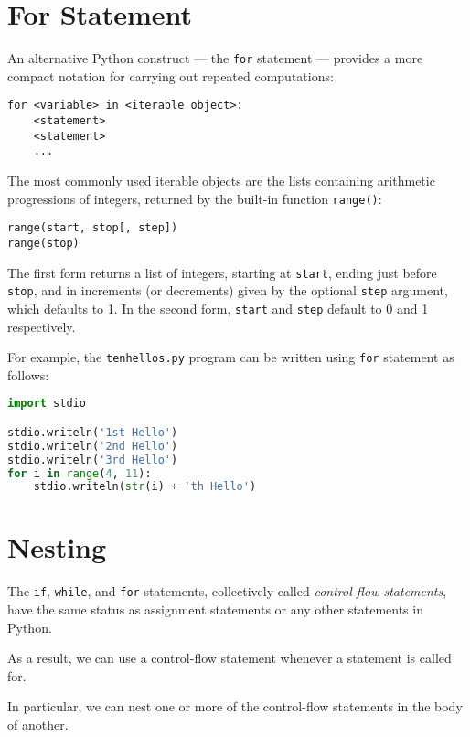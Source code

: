 \documentclass[8pt,a4paper,compress,handout]{beamer}
\begin{document}
\section{For Statement}
\begin{frame}[fragile]
An alternative Python construct --- the \lstinline{for} statement --- provides a more compact notation for carrying out repeated computations:

\smallskip

\begin{lstlisting}[language={}]
for <variable> in <iterable object>:
    <statement>
    <statement>
    ...
\end{lstlisting}

\bigskip

The most commonly used iterable objects are the lists containing arithmetic progressions of integers, returned by the built-in function \lstinline{range()}:

\begin{lstlisting}[language={}]
range(start, stop[, step])
range(stop)
\end{lstlisting}

The first form returns a list of integers, starting at \lstinline{start}, ending just before \lstinline{stop}, and in increments (or decrements) given by the optional \lstinline{step} argument, which defaults to 1. In the second form, \lstinline{start} and \lstinline{step} default to 0 and 1 respectively.

\bigskip

For example, the \lstinline{tenhellos.py} program can be written using \lstinline{for} statement as follows:

\begin{lstlisting}[language=Python]
import stdio

stdio.writeln('1st Hello')
stdio.writeln('2nd Hello')
stdio.writeln('3rd Hello')
for i in range(4, 11):
    stdio.writeln(str(i) + 'th Hello')
\end{lstlisting}
\end{frame}

\section{Nesting}
\begin{frame}[fragile]
The \lstinline{if}, \lstinline{while}, and \lstinline{for} statements, collectively called \emph{control-flow statements}, have the same status as assignment statements or any other statements in Python.

\bigskip

As a result, we can use a control-flow statement whenever a statement is called for. 

\bigskip

In particular, we can nest one or more of the control-flow statements in the body of another. 
\end{frame}
\end{document}
